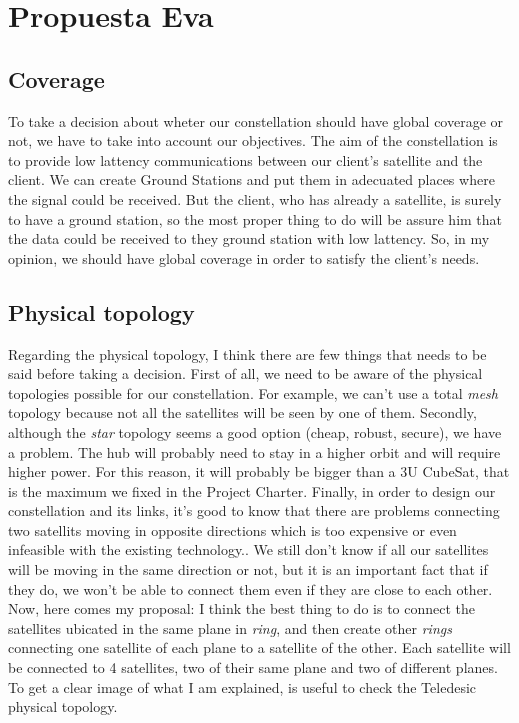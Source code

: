 \section{Propuesta Eva}
\subsection{Coverage}
To take a decision about wheter our constellation should have global coverage or not, we have to take into account our objectives. The aim of the constellation is to provide low lattency communications between our client's satellite and the client. We can create Ground Stations and put them in adecuated places where the signal could be received. But the client, who has already a satellite, is surely to have a ground station, so the most proper thing to do will be assure him that the data could be received to they ground station with low lattency. So, in my opinion, we should have global coverage in order to satisfy the client's needs. 
\subsection{Physical topology}
Regarding the physical topology, I think there are few things that needs to be said before taking a decision. First of all, we need to be aware of the physical topologies possible for our constellation. For example, we can't use a total \textit{mesh} topology because not all the satellites will be seen by one of them. Secondly, although the \textit{star} topology seems a good option (cheap, robust, secure), we have a problem. The hub will probably need to stay in a higher orbit and will require higher power. For this reason, it will probably be bigger than a 3U CubeSat, that is the maximum we fixed in the Project Charter. Finally, in order to design our constellation and its links, it's good to know that there are problems connecting two satellits moving in opposite directions which is too expensive or even infeasible with the existing technology.\cite{Ferreira2002}. We still don't know if all our satellites will be moving in the same direction or not, but it is an important fact that if they do, we won't be able to connect them even if they are close to each other. Now, here comes my proposal: I think the best thing to do is to connect the satellites ubicated in the same plane in \textit{ring}, and then create other \textit{rings} connecting one satellite of each plane to a satellite of the other. Each satellite will be connected to 4 satellites, two of their same plane and two of different planes. To get a clear image of what I am explained, is useful to check the Teledesic physical topology.\cite{Wood2003}\\

 
